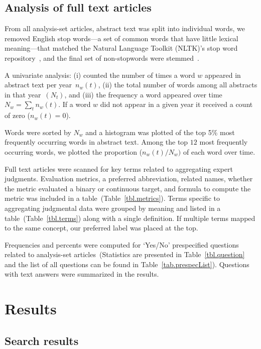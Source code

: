 \documentclass[preprint,authoryear,nonatbib]{elsarticle}
\begin{document}
\subsection{Analysis of full text articles}

From all analysis-set articles, abstract text was split into individual words, we removed English stop words---a set of common words that have little lexical meaning---that matched the Natural Language Toolkit (NLTK)'s stop word repository~\parencite{loper2002nltk}, and the final set of non-stopwords were stemmed~\parencite{willett2006porter}.

A univariate analysis: (i) counted the number of times a word $w$ appeared in abstract text per year~$n_{w}(t)$, (ii) the total number of words among all abstracts in that year~$(N_{t})$, and (iii) the frequency a word appeared over time $N_{w} = \sum_{t} n_{w}(t)$.
If a word $w$ did not appear in a given year it received a count of zero ($n_{w}(t)=0$).

Words were sorted by $N_{w}$ and a histogram was plotted of the top 5\% most frequently occurring words in abstract text.
Among the top $12$ most frequently occurring words, we plotted the proportion ($n_{w}(t)/N_{w})$ of each word over time.

Full text articles were scanned for key terms related to aggregating expert judgments.
Evaluation metrics, a preferred abbreviation, related names, whether the metric evaluated a binary or continuous target, and formula to compute the metric was included in a table~(Table~\ref{tbl.metrics}).  
Terms specific to aggregating judgmental data were grouped by meaning and listed in a table~(Table~\ref{tbl.terms}) along with a single definition.
If multiple terms mapped to the same concept, our preferred label was placed at the top. 

Frequencies and percents were computed for `Yes/No' prespecified questions related to analysis-set articles~(Statistics are presented in Table~\ref{tbl.question} and the list of all questions can be found in Table~\ref{tab.prespecList}).
Questions with text answers were summarized in the results. 

\section{Results}
\label{sec.results}

\subsection{Search results}
\end{document}
